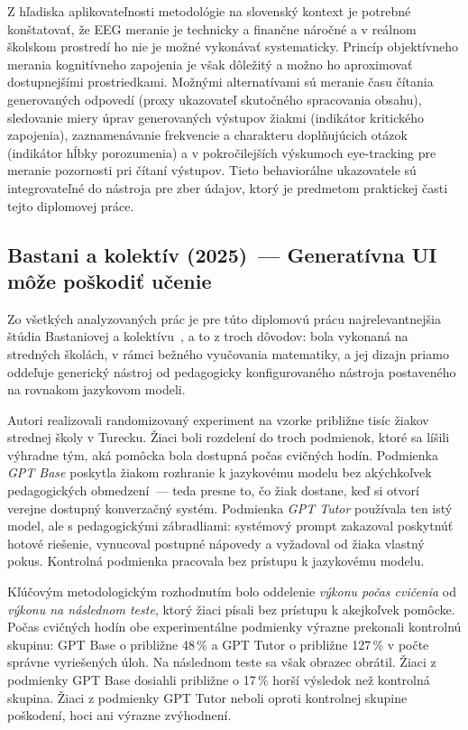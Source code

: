 Z hľadiska aplikovateľnosti metodológie na slovenský kontext je potrebné konštatovať, že EEG meranie je technicky a finančne náročné a v reálnom školskom prostredí ho nie je možné vykonávať systematicky. Princíp objektívneho merania kognitívneho zapojenia je však dôležitý a možno ho aproximovať dostupnejšími prostriedkami. Možnými alternatívami sú meranie času čítania generovaných odpovedí (proxy ukazovateľ skutočného spracovania obsahu), sledovanie miery úprav generovaných výstupov žiakmi (indikátor kritického zapojenia), zaznamenávanie frekvencie a charakteru doplňujúcich otázok (indikátor hĺbky porozumenia) a v pokročilejších výskumoch eye-tracking pre meranie pozornosti pri čítaní výstupov. Tieto behaviorálne ukazovatele sú integrovateľné do nástroja pre zber údajov, ktorý je predmetom praktickej časti tejto diplomovej práce.


\subsection{Bastani a kolektív (2025)~--- Generatívna UI môže poškodiť učenie}
\label{subsec:bastani}

Zo všetkých analyzovaných prác je pre túto diplomovú prácu najrelevantnejšia štúdia Bastaniovej a kolektívu~\cite{bastani2025harm}, a to z troch dôvodov: bola vykonaná na stredných školách, v rámci bežného vyučovania matematiky, a jej dizajn priamo oddeľuje generický nástroj od pedagogicky konfigurovaného nástroja postaveného na rovnakom jazykovom modeli.

Autori realizovali randomizovaný experiment na vzorke približne tisíc žiakov strednej školy v Turecku. Žiaci boli rozdelení do troch podmienok, ktoré sa líšili výhradne tým, aká pomôcka bola dostupná počas cvičných hodín. Podmienka \emph{GPT Base} poskytla žiakom rozhranie k jazykovému modelu bez akýchkoľvek pedagogických obmedzení~--- teda presne to, čo žiak dostane, keď si otvorí verejne dostupný konverzačný systém. Podmienka \emph{GPT Tutor} používala ten istý model, ale s pedagogickými zábradliami: systémový prompt zakazoval poskytnúť hotové riešenie, vynucoval postupné nápovedy a vyžadoval od žiaka vlastný pokus. Kontrolná podmienka pracovala bez prístupu k jazykovému modelu.

Kľúčovým metodologickým rozhodnutím bolo oddelenie \emph{výkonu počas cvičenia} od \emph{výkonu na následnom teste}, ktorý žiaci písali bez prístupu k akejkoľvek pomôcke. Počas cvičných hodín obe experimentálne podmienky výrazne prekonali kontrolnú skupinu: GPT Base o približne 48\,\% a GPT Tutor o približne 127\,\% v počte správne vyriešených úloh. Na následnom teste sa však obrazec obrátil. Žiaci z podmienky GPT Base dosiahli približne o 17\,\% horší výsledok než kontrolná skupina. Žiaci z podmienky GPT Tutor neboli oproti kontrolnej skupine poškodení, hoci ani výrazne zvýhodnení.

